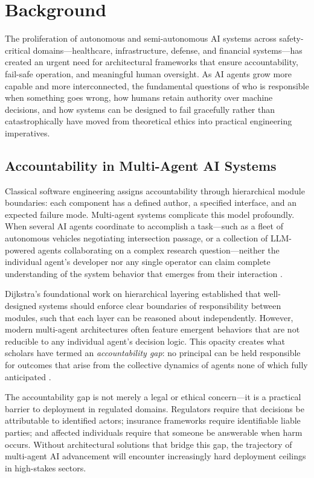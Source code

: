 \section{Background}

The proliferation of autonomous and semi-autonomous AI systems across safety-critical domains—healthcare, infrastructure, defense, and financial systems—has created an urgent need for architectural frameworks that ensure accountability, fail-safe operation, and meaningful human oversight. As AI agents grow more capable and more interconnected, the fundamental questions of who is responsible when something goes wrong, how humans retain authority over machine decisions, and how systems can be designed to fail gracefully rather than catastrophically have moved from theoretical ethics into practical engineering imperatives.

\subsection{Accountability in Multi-Agent AI Systems}

Classical software engineering assigns accountability through hierarchical module boundaries: each component has a defined author, a specified interface, and an expected failure mode. Multi-agent systems complicate this model profoundly. When several AI agents coordinate to accomplish a task—such as a fleet of autonomous vehicles negotiating intersection passage, or a collection of LLM-powered agents collaborating on a complex research question—neither the individual agent's developer nor any single operator can claim complete understanding of the system behavior that emerges from their interaction \cite{dijkstra1982}.

Dijkstra's foundational work on hierarchical layering established that well-designed systems should enforce clear boundaries of responsibility between modules, such that each layer can be reasoned about independently. However, modern multi-agent architectures often feature emergent behaviors that are not reducible to any individual agent's decision logic. This opacity creates what scholars have termed an \emph{accountability gap}: no principal can be held responsible for outcomes that arise from the collective dynamics of agents none of which fully anticipated \cite{bansal2019}.

The accountability gap is not merely a legal or ethical concern—it is a practical barrier to deployment in regulated domains. Regulators require that decisions be attributable to identified actors; insurance frameworks require identifiable liable parties; and affected individuals require that someone be answerable when harm occurs. Without architectural solutions that bridge this gap, the trajectory of multi-agent AI advancement will encounter increasingly hard deployment ceilings in high-stakes sectors.

